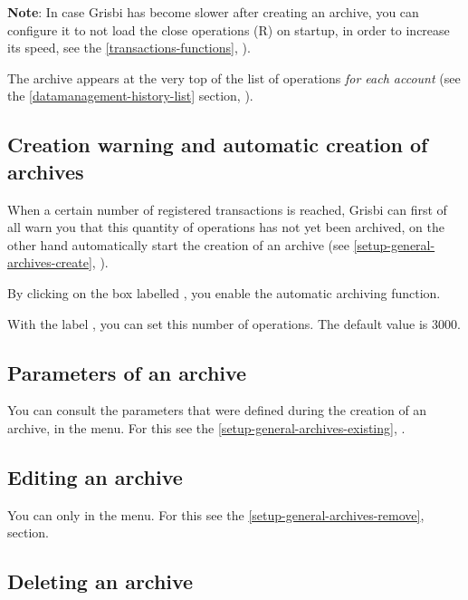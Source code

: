 \textbf{Note}: In case Grisbi has become slower after creating an archive, you can configure it to not load the close operations (R) on startup, in order to increase its speed, see the \ref{transactions-functions}, ).

The archive appears at the very top of the list of operations \emph{for each account} (see the \vref{datamanagement-history-list} section, ).


\subsection{Creation warning and automatic creation of archives\label{datamanagement-history-auto}}

When a certain number of registered transactions is reached, Grisbi can first of all warn you that this quantity of operations has not yet been archived, on the other hand automatically start the creation of an archive (see \vref{setup-general-archives-create}, ).

By clicking on the box labelled , you enable the automatic archiving function.

With the label , you can set this number of operations. The default value is 3000.


\subsection{Parameters of an archive\label{datamanagement-history-parameters}}
You can consult the parameters that were defined during the creation of an archive, in the 
 menu. For this see the \vref{setup-general-archives-existing}, .


\subsection{Editing an archive\label{datamanagement-history-modify}}

You can only  in the  menu. For this see the \vref{setup-general-archives-remove},  section.


\subsection{Deleting an archive\label{datamanagement-history-remove}}

